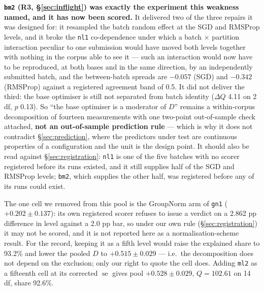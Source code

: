 \documentclass[10pt,letterpaper]{article}
\newcommand{\Dstat}{D}                         %
\newcommand{\arm}[1]{\texttt{#1}}
\DeclareMathOperator{\se}{se}
\begin{document}
\textbf{\arm{bm2} (R3, \S\ref{sec:inflight}) was exactly the experiment this weakness named, and
it has now been scored.} It delivered two of the three repairs it was designed for: it resampled
the batch random effect at the SGD and RMSProp levels, and it broke the \arm{nl1} co-dependence
under which a batch $\times$ partition interaction peculiar to one submission would have moved
both levels together with nothing in the corpus able to see it --- such an interaction would now
have to be reproduced, at both bases and in the same direction, by an independently submitted
batch, and the between-batch spreads are $-0.057$ (SGD) and $-0.342$ (RMSProp) against a
registered agreement band of 0.5. It did not deliver the third: the base optimiser is still not
separated from batch identity ($\Delta Q$ 4.11 on 2 df, $p$ 0.13). So
``the base optimiser is a moderator of $\Dstat$'' remains a within-corpus decomposition of
fourteen measurements with one two-point out-of-sample check attached,
\textbf{not an out-of-sample prediction rule} --- which is why it does not
contradict \S\ref{sec:prediction}, where the predictors under test are continuous properties of
a configuration and the unit is the design point. It should also be read against
\S\ref{sec:registration}: \arm{nl1} is one of the five batches with no scorer registered before
its runs existed, and it still supplies half of the SGD and RMSProp levels; \arm{bm2}, which
supplies the other half, was registered before any of its runs could exist.

The one cell we removed from this pool is the GroupNorm arm of \arm{gn1} ($+0.202 \pm 0.137$):
its own registered scorer refuses to issue a verdict on a 2.862 pp difference in level against a
2.0 pp bar, so under our
own rule (\S\ref{sec:registration}) it may not be scored, and it is not reported here as a
normalisation-scheme result. For the record, keeping it as a fifth level would raise the
explained share to 93.2\% and lower the pooled $\Dstat$ to $+0.515 \pm 0.029$ --- i.e.\ the
decomposition does not depend on the exclusion; only our right to quote the cell does. Adding
\arm{ml2} as a fifteenth cell at its corrected $\se$ gives pool $+0.528 \pm 0.029$,
$Q = 102.61$ on 14 df, share 92.6\%.
\end{document}
